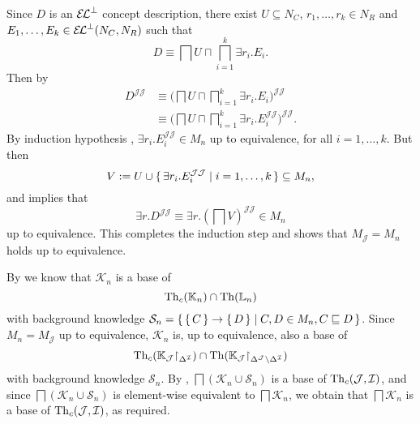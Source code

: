 \begin{Proof}
  Since $D$ is an ${{\mathcal{E}\kern-.3ex\mathcal{L}}^\bot}$ concept description, there exist $U \subseteq N_{C}$, $r_{1},
  \dots, r_{k} \in N_{R}$ and $E_{1}, \dots, E_{k} \in {\ensuremath{{\mathcal{E}\kern-.3ex\mathcal{L}}^\bot}}(N_{C}, N_{R})$ such that
  \begin{equation*}
    D \equiv \bigsqcap U \sqcap \bigsqcap_{i=1}^{k} \exists r_{i}. E_{i}.
  \end{equation*}
  Then by 
  \begin{align*}
    D^{\mathcal{J}\mathcal{J}}
    &\equiv \bigl( \bigsqcap U \sqcap \bigsqcap_{i=1}^{k} \exists r_{i}. E_{i}
    \bigr)^{\mathcal{J}\mathcal{J}} \\
    &\equiv \bigl( \bigsqcap U \sqcap \bigsqcap_{i=1}^{k} \exists
    r_{i}. E_{i}^{\mathcal{J}\mathcal{J}} \bigr)^{\mathcal{J}\mathcal{J}}.
  \end{align*}
  By induction hypothesis , $\exists r_{i}. E_{i}^{\mathcal{J}\mathcal{J}} \in
  M_{n}$ up to equivalence, for all $i = 1, \dots, k$.  But then
  \begin{equation*}
    V := U \cup {\ensuremath{\{\, \exists r_{i}. E_{i}^{\mathcal{J}\mathcal{J}} \mid i = 1, \dots, k \,\}}}
    \subseteq M_{n},
  \end{equation*}
  and  implies that
  \begin{equation*}
    \exists r. D^{\mathcal{J}\mathcal{J}} \equiv \exists r. (\bigsqcap
    V)^{\mathcal{J}\mathcal{J}} \in M_{n}
  \end{equation*}
  up to equivalence.  This completes the induction step and shows that $M_{\mathcal{J}} =
  M_{n}$ holds up to equivalence.

  By  we
  know that $\mathcal{K}_{n}$ is a base of
  \begin{equation*}
    \operatorname{Th}_{c}({\mathbb{K}}_{n}) \cap \operatorname{Th}({\mathbb{L}}_{n})
  \end{equation*}
  with background knowledge $\mathcal{S}_{n} = {\{\, {\{\, C \,\}} \to {\ensuremath{\{\, D \,\}}} \mid C, D \in
    M_{n}, C \sqsubseteq D \,\}}$.  Since $M_{n} = M_{\mathcal{J}}$ up to equivalence,
  $\mathcal{K}_{n}$ is, up to equivalence, also a base of
  \begin{equation*}
    \operatorname{Th}_{c}({\mathbb{K}}_{\mathcal{J}} \mathord{\upharpoonright}_{\Delta^{\mathcal{I}}}) \cap \operatorname{Th}({\mathbb{K}}_{\mathcal{J}} \mathord{\upharpoonright}_{\Delta^{\mathcal{J}} \setminus \Delta^{\mathcal{I}}})
  \end{equation*}
  with background knowledge $\mathcal{S}_{n}$.  By
  , $\bigsqcap
  (\mathcal{K}_{n} \cup \mathcal{S}_{n})$ is a base of $\operatorname{Th}_{c}(\mathcal{J},
  \mathcal{I})$, and since $\bigsqcap (\mathcal{K}_{n} \cup \mathcal{S}_{n})$ is
  element-wise equivalent to $\bigsqcap \mathcal{K}_{n}$, we obtain that $\bigsqcap
  \mathcal{K}_{n}$ is a base of $\operatorname{Th}_{c}(\mathcal{J}, \mathcal{I})$, as required.
\end{Proof}

